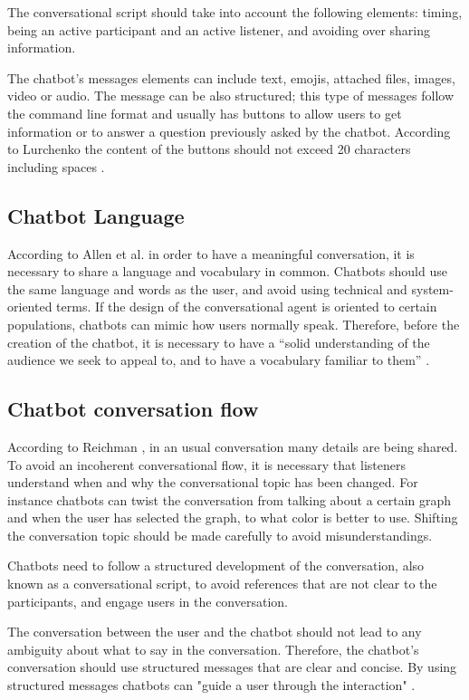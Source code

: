 \documentclass[a4paper,10pt]{article}
\begin{document}
The conversational script should take into account the following elements: timing, being an active participant and an active listener, and avoiding over sharing information.

The chatbot's messages elements can include text, emojis, attached files, images, video or audio. The message can be also structured; this type of messages follow the command line format and usually has buttons to allow users to get information or to answer a question previously asked by the chatbot. According to Lurchenko the content of the buttons should not exceed 20 characters including spaces \cite{CheatSheet}.

\subsection*{Chatbot Language}
According to Allen et al. \cite{allen1978conversation} in order to have a meaningful conversation, it is necessary to share a language and vocabulary in common. Chatbots should use the same language and words as the user, and avoid using technical and system-oriented terms. If the design of the conversational agent is oriented to certain populations, chatbots can mimic how users normally speak.  Therefore, before the creation of the chatbot, it is necessary to have a ``solid understanding of the audience we seek to appeal to, and to have a vocabulary familiar to them”  \cite{HeuristicsWebPage}. 

\subsection*{Chatbot conversation flow}
According to Reichman \cite{reichman1985getting}, in an usual conversation many details are being shared. To avoid an incoherent conversational flow, it is necessary that listeners understand when and why the conversational topic has been changed. For instance chatbots can twist the conversation from talking about a certain graph and when the user has selected the graph, to what color is better to use. Shifting the conversation topic should be made carefully to avoid misunderstandings. 

Chatbots need to follow a structured development of the conversation, also known as a conversational script, to avoid references that are not clear to the participants, and engage users in the conversation.

The conversation between the user and the chatbot should not lead to any ambiguity about what to say in the conversation. Therefore, the chatbot's conversation should use structured messages that are clear and concise. By using structured messages chatbots can "guide a user through the interaction" \cite{HeuristicsWebPage}.
\end{document}
